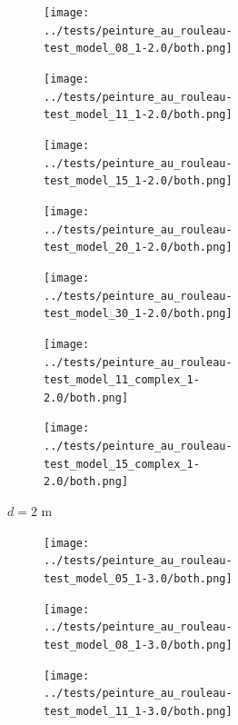 \documentclass[francais,RandD]{rapportPFE}
\begin{document}
\begin{figure}[H]
\begin{subfigure}[t]{\linewidth}
\begin{subfigure}[t]{0.11\linewidth}
				\end{subfigure}
				\hfill
				\begin{subfigure}[t]{0.11\linewidth}
					\texttt{[image: ../tests/peinture\_au\_rouleau-test\_model\_08\_1-2.0/both.png]}
				\end{subfigure}
				\hfill
				\begin{subfigure}[t]{0.11\linewidth}
					\texttt{[image: ../tests/peinture\_au\_rouleau-test\_model\_11\_1-2.0/both.png]}
				\end{subfigure}
				\hfill
				\begin{subfigure}[t]{0.11\linewidth}
					\texttt{[image: ../tests/peinture\_au\_rouleau-test\_model\_15\_1-2.0/both.png]}
				\end{subfigure}
				\hfill
				\begin{subfigure}[t]{0.1\linewidth}
					\texttt{[image: ../tests/peinture\_au\_rouleau-test\_model\_20\_1-2.0/both.png]}
				\end{subfigure}
				\hfill
				\begin{subfigure}[t]{0.11\linewidth}
					\texttt{[image: ../tests/peinture\_au\_rouleau-test\_model\_30\_1-2.0/both.png]}
				\end{subfigure}
				\hfill
				\begin{subfigure}[t]{0.11\linewidth}
					\texttt{[image: ../tests/peinture\_au\_rouleau-test\_model\_11\_complex\_1-2.0/both.png]}
				\end{subfigure}
				\hfill
				\begin{subfigure}[t]{0.11\linewidth}
					\texttt{[image: ../tests/peinture\_au\_rouleau-test\_model\_15\_complex\_1-2.0/both.png]}
				\end{subfigure}
				\caption{$d = 2$ m}
			\end{subfigure}
			\hfill
			\begin{subfigure}[t]{\linewidth}
				\centering
				\begin{subfigure}[t]{0.11\linewidth}
					\texttt{[image: ../tests/peinture\_au\_rouleau-test\_model\_05\_1-3.0/both.png]}
				\end{subfigure}
				\hfill
				\begin{subfigure}[t]{0.11\linewidth}
					\texttt{[image: ../tests/peinture\_au\_rouleau-test\_model\_08\_1-3.0/both.png]}
				\end{subfigure}
				\hfill
				\begin{subfigure}[t]{0.11\linewidth}
					\texttt{[image: ../tests/peinture\_au\_rouleau-test\_model\_11\_1-3.0/both.png]}
				\end{subfigure}

\end{subfigure}
\end{figure}
\end{document}
